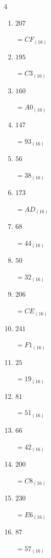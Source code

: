 \begin{multicols}{4}
\begin{enumerate}
        $=51_{(16)}$

  \item $207$

        $=CF_{(16)}$

  \item $195$

        $=C3_{(16)}$

  \item $160$

        $=A0_{(16)}$

  \item $147$

        $=93_{(16)}$

  \item $56$

        $=38_{(16)}$

  \item $173$

        $=AD_{(16)}$

  \item $68$

        $=44_{(16)}$

  \item $50$

        $=32_{(16)}$

  \item $206$

        $=CE_{(16)}$

  \item $241$

        $=F1_{(16)}$

  \item $25$

        $=19_{(16)}$

  \item $81$

        $=51_{(16)}$

  \item $66$

        $=42_{(16)}$

  \item $200$

        $=C8_{(16)}$

\columnbreak %

  \item $230$

        $=E6_{(16)}$

  \item $87$

        $=57_{(16)}$


\end{enumerate}
\end{multicols}
